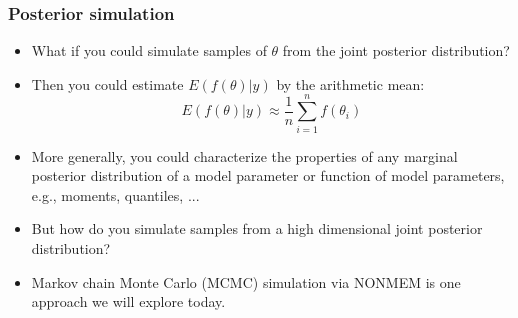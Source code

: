 \documentclass{beamer}
\begin{document}
\begin{frame}
  \frametitle{Posterior simulation}

  \begin{itemize}
  \item<1-> What if you could simulate samples of $\theta$ from the joint
    posterior distribution?
  \item<2-> Then you could estimate
    $E\left(f\left(\theta\right)|y\right)$ by the arithmetic mean:
$$E\left(f\left(\theta\right)|y\right) \approx \frac{1}{n}
\sum_{i=1}^n f\left(\theta_i\right)$$
\item<3-> More generally, you could characterize the properties of any
  marginal posterior distribution of a model parameter or function of
  model parameters, e.g., moments, quantiles, ...
\item<4-> But how do you simulate samples from a high dimensional joint
  posterior distribution?
\item<5-> Markov chain Monte Carlo (MCMC) simulation via NONMEM is one
  approach we will explore today.
\end{itemize}

\end{frame}


\end{document}
